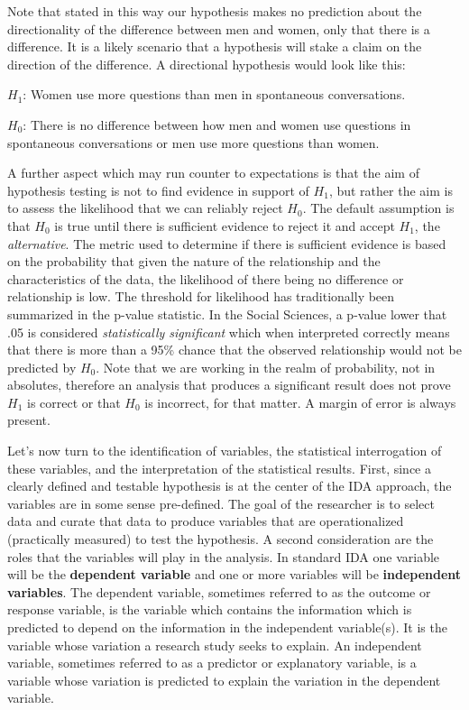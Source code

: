 \documentclass[
  letterpaper,
]{latex/krantz}
\begin{document}
Note that stated in this way our hypothesis makes no prediction about
the directionality of the difference between men and women, only that
there is a difference. It is a likely scenario that a hypothesis will
stake a claim on the direction of the difference. A directional
hypothesis would look like this:

\(H_1\): Women use more questions than men in spontaneous conversations.

\(H_0\): There is no difference between how men and women use questions
in spontaneous conversations or men use more questions than women.

A further aspect which may run counter to expectations is that the aim
of hypothesis testing is not to find evidence in support of \(H_1\), but
rather the aim is to assess the likelihood that we can reliably reject
\(H_0\). The default assumption is that \(H_0\) is true until there is
sufficient evidence to reject it and accept \(H_1\), the
\emph{alternative}. The metric used to determine if there is sufficient
evidence is based on the probability that given the nature of the
relationship and the characteristics of the data, the likelihood of
there being no difference or relationship is low. The threshold for
likelihood has traditionally been summarized in the p-value statistic.
In the Social Sciences, a p-value lower that .05 is considered
\emph{statistically significant} which when interpreted correctly means
that there is more than a 95\% chance that the observed relationship
would not be predicted by \(H_0\). Note that we are working in the realm
of probability, not in absolutes, therefore an analysis that produces a
significant result does not prove \(H_1\) is correct or that \(H_0\) is
incorrect, for that matter. A margin of error is always present.

Let's now turn to the identification of variables, the statistical
interrogation of these variables, and the interpretation of the
statistical results. First, since a clearly defined and testable
hypothesis is at the center of the IDA approach, the variables are in
some sense pre-defined. The goal of the researcher is to select data and
curate that data to produce variables that are operationalized
(practically measured) to test the hypothesis. A second consideration
are the roles that the variables will play in the analysis. In standard
IDA one variable will be the \textbf{dependent variable} and one or more
variables will be \textbf{independent variables}. The dependent
variable, sometimes referred to as the outcome or response variable, is
the variable which contains the information which is predicted to depend
on the information in the independent variable(s). It is the variable
whose variation a research study seeks to explain. An independent
variable, sometimes referred to as a predictor or explanatory variable,
is a variable whose variation is predicted to explain the variation in
the dependent variable.
\end{document}
